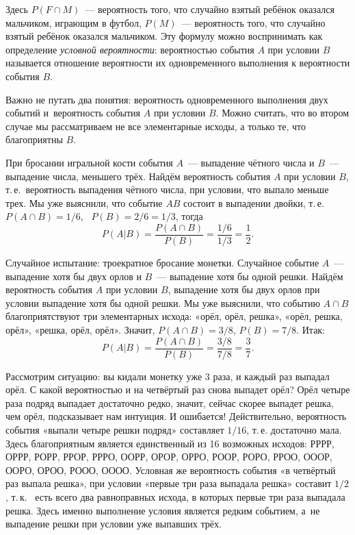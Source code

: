 \documentclass[11pt]{article}
\begin{document}
Здесь $P(F\cap M)$~--- вероятность того, что случайно взятый ребёнок оказался мальчиком, играющим в футбол, $P(M)$~--- вероятность того, что случайно взятый ребёнок оказался мальчиком. Эту формулу можно воспринимать как определение \emph{условной вероятности}: вероятностью события $A$ при условии $B$ называется отношение вероятности их одновременного выполнения к вероятности события $B$.

Важно не путать два понятия: вероятность одновременного выполнения двух событий и~вероятность события $A$ при условии $B$. Можно считать, что во втором случае мы рассматриваем не все элементарные исходы, а только те, что благоприятны $B$.

\begin{example}
	При бросании игральной кости события $A$~--- выпадение чётного числа  и $B$~--- выпадение числа, меньшего трёх. Найдём вероятность события $A$ при условии $B$, т.\,е.~вероятность выпадения чётного числа, при условии, что выпало меньше трех. Мы уже выяснили, что событие $AB$ состоит в выпадении двойки, т.\,е.~$P(A\cap B)=1/6$,~ $P(B)=2/6=1/3$, тогда
	$$
	P(A|B) =\frac{P(A\cap B)}{P(B)}=\frac{1/6}{1/3}=\frac{1}{2}.
	$$
\end{example}
\begin{example}
	Случайное испытание: троекратное бросание монетки. Случайное событие $A$~--- выпадение хотя бы двух орлов и $B$~--- выпадение хотя бы одной решки. Найдём вероятность события $A$ при условии $B$, выпадение хотя бы двух орлов при условии выпадение хотя бы одной решки. Мы уже выяснили, что событию $A\cap B$ благоприятствуют три элементарных исхода: «орёл, орёл, решка», «орёл, решка, орёл», «решка, орёл, орёл». Значит, $P(A\cap B)=3/8$, $P(B)=7/8$. Итак:
	$$
	P(A|B) =\frac{P(A\cap B)}{P(B)}=\frac{3/8}{7/8}=\frac{3}{7}.
	$$
\end{example}

\begin{example}
	Рассмотрим ситуацию: вы кидали монетку уже 3 раза, и каждый раз выпадал орёл. С какой вероятностью и на четвёртый раз снова выпадет орёл? Орёл четыре раза подряд выпадает достаточно редко, значит, сейчас скорее выпадет решка, чем орёл, подсказывает нам интуиция. И ошибается! Действительно, вероятность события «выпали четыре решки подряд» составляет $1/16$, т.\,е. достаточно мала. Здесь благоприятным является единственный из 16 возможных исходов: РРРР, ОРРР, РОРР, РРОР, РРРО, ООРР, ОРОР, ОРРО, РООР, РОРО, РРОО, ОООР, ООРО, ОРОО, РООО, ОООО. Условная же вероятность события «в четвёртый раз выпала решка», при условии «первые три раза выпадала решка»  составит $1/2$, т.\,к. ~есть всего два равноправных исхода, в которых первые три раза выпадала решка. Здесь именно выполнение условия является редким событием, а~не выпадение решки при условии уже выпавших трёх.
\end{example}
\end{document}
